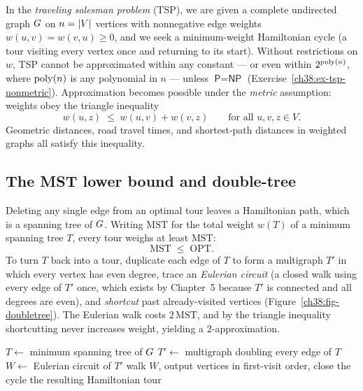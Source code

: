 In the \emph{traveling salesman problem} (TSP), we are given a complete undirected graph $G$ on $n = \lvert V\rvert$
vertices with nonnegative edge weights $w(u,v) = w(v,u) \ge 0$, and we seek a minimum-weight Hamiltonian cycle
(a tour visiting every vertex once and returning to its start). Without restrictions on $w$, TSP cannot be
approximated within any constant --- or even within $2^{\operatorname{poly}(n)}$, where $\operatorname{poly}(n)$ is any polynomial in $n$ ---
unless $\textsf{P}=\textsf{NP}$ (Exercise~\ref{ch38:ex-tsp-nonmetric}). Approximation becomes possible under
the \emph{metric} assumption: weights obey the triangle inequality
\[
  w(u,z) \;\le\; w(u,v) + w(v,z) \qquad\text{for all } u,v,z\in V.
\]
Geometric distances, road travel times, and shortest-path distances in weighted graphs all satisfy this inequality.

\subsection{The MST lower bound and double-tree}

\begin{intuitionbox}
Deleting any single edge from an optimal tour leaves a Hamiltonian path, which is a spanning tree of $G$.
Writing $\mathrm{MST}$ for the total weight $w(T)$ of a minimum spanning tree $T$, every tour weighs at least $\mathrm{MST}$:
\[
  \mathrm{MST} \;\le\; \mathrm{OPT}.
\]
To turn $T$ back into a tour, duplicate each edge of $T$ to form a multigraph $T'$ in which every vertex has
even degree, trace an \emph{Eulerian circuit} (a closed walk using every edge of $T'$ once, which exists by
Chapter~5 because $T'$ is connected and all degrees are even), and \emph{shortcut} past already-visited
vertices (Figure~\ref{ch38:fig-doubletree}). The Eulerian walk costs $2\,\mathrm{MST}$, and by the triangle
inequality shortcutting never increases weight, yielding a $2$-approximation.
\end{intuitionbox}

\begin{algorithm}[H]
\caption{\textsc{DoubleTreeTSP}$(\Gph,w)$ -- metric}\label{ch38:alg-doubletree}
\DontPrintSemicolon
$T \gets$ minimum spanning tree of $G$\;
$T' \gets$ multigraph doubling every edge of $T$ 
$W \gets$ Eulerian circuit of $T'$ 
walk $W$, output vertices in first-visit order, close the cycle\;
\Return the resulting Hamiltonian tour\;
\end{algorithm}

